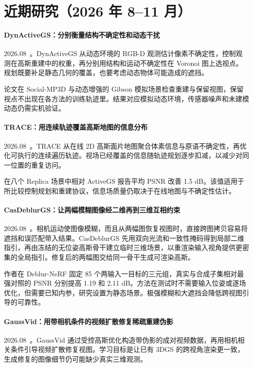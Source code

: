 \section{近期研究（2026 年 8--11 月）}
\paragraph{DynActiveGS：分别衡量结构不确定性和动态干扰}
2026.08~\cite{2608_01178}。DynActiveGS 从动态环境的 RGB-D 观测估计像素不确定性，控制观测在高斯重建中的权重，再分别用结构和运动不确定性在 Voronoi 图上选视点。规划既要补足静态几何的覆盖，也要考虑动态物体可能造成的遮挡。

论文在 Social-MP3D 与动态增强的 Gibson 模拟场景检查重建与保留视图，保留视点不出现在各方法的训练轨迹里。结果对应模拟动态环境，传感器噪声和未建模动态仍需实机验证。

\paragraph{TRACE：用连续轨迹覆盖高斯地图的信息分布}
2026.08~\cite{2608_02304}。TRACE 从在线 2D 高斯面片地图聚合体素信息与原语不确定性，再优化可执行的连续遍历轨迹。视场已经覆盖的信息随轨迹规划逐步扣减，以减少对同一位置的重复访问。

在八个 Replica 场景中相对 ActiveGS 报告平均 PSNR 改善 1.5 dB。该值适用于所比较控制规划和重建协议，信息场质量仍取决于在线地图与不确定性估计。

\paragraph{CasDeblurGS：让两幅模糊图像经二维再到三维互相约束}
2026.08~\cite{2608_10345}。相机运动使图像模糊，而且从两幅图恢复视图时，直接跨图拷贝容易将遮挡和误匹配带入结果。CasDeblurGS 先用双向光流和一致性掩码得到局部二维指引，再由冻结的无位姿高斯骨干建立临时三维场景，以重渲染输入视角提供更密集的全局指引。修复后的两幅图交给同一骨干生成可渲染高斯。

作者在 Deblur-NeRF 固定 85 个两输入一目标的三元组，真实与合成子集相对最强对照的 PSNR 分别提高 1.19 和 2.11 dB。方法在测试时不需要输入位姿或逐场优化，但需要已知内参，研究设置为静态场景。极强模糊和大遮挡会降低跨视图引导的可靠性。

\paragraph{GaussVid：用带相机条件的视频扩散修复稀疏重建伪影}
2026.08~\cite{2608_21849}。GaussVid 通过受控高斯优化构造带伪影的成对视频数据，再用相机相关条件引导视频扩散修复视图。学习目标是让已有 3DGS 的跨视角渲染更一致，生成修复的图像细节仍可能缺少真实三维观测。

